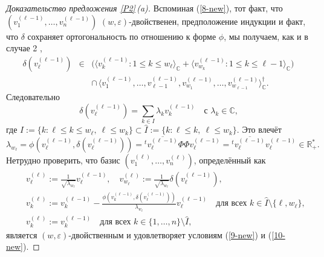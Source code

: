 \documentclass{amsart}
\theoremstyle{definition}
\begin{document}
\begin{proof}[Доказательство предложения \ref{P2}\,{\rm (a)}]
\medskip
{}

Вспоминая (\ref{8-new}), тот факт, что
$(v_1^{(\ell-1)},\ldots,v_n^{(\ell-1)})$
$(w,\varepsilon)$-двойственен, предположение индукции и  факт, что $\delta$ сохраняет ортогональность по отношению к форме $\phi$, мы получаем, как и в случае 2 ,
\begin{eqnarray*}
\delta(v_\ell^{(\ell-1)}) & \in & \big(\langle v_k^{(\ell-1)}:1\leq
k\leq w_\ell\rangle_\mathbb{C}+\langle v_{w_k}^{(\ell-1)}:1\leq k\leq
\ell-1\rangle_\mathbb{C}\big) \\
 & & \cap\,\langle
v_1^{(\ell-1)},\ldots,v_{\ell-1}^{(\ell-1)},v_{w_1}^{(\ell-1)},\ldots,v_{w_{\ell-1}}^{(\ell-1)}\rangle_\mathbb{C}^\dag.
\end{eqnarray*} Следовательно
\begin{equation} \label{11-new}
\delta(v_\ell^{(\ell-1)})=\sum_{k\in
I}\lambda_kv_k^{(\ell-1)}\quad\mbox{с $\lambda_k\in\mathbb{C}$,}
\end{equation}
где $I:=\{k:\ell\leq k\leq w_\ell,\ \ell\leq w_k\}\subset\hat{I}:=\{k:\ell\leq k,\ \ell\leq w_k\}$.
Это влечёт
\[\lambda_{w_\ell}=\phi(v_\ell^{(\ell-1)},\delta(v_\ell^{(\ell-1)}))={}^t\overline{v_\ell^{(\ell-1)}}\Phi\Phi v_\ell^{(\ell-1)}={}^t\overline{v_\ell^{(\ell-1)}}v_\ell^{(\ell-1)}\in\mathbb{R}_+^*.\]
Нетрудно проверить, что базис
$(v_1^{(\ell)},\ldots,v_n^{(\ell)})$, определённый как
\begin{eqnarray*}
 & & v_\ell^{(\ell)}:=\frac{1}{\sqrt{\lambda_{w_\ell}}}v_\ell^{(\ell-1)},\quad
v_{w_\ell}^{(\ell)}:=\frac{1}{\sqrt{\lambda_{w_\ell}}}\delta(v_\ell^{(\ell-1)}),
\\
 & & v_k^{(\ell)}:=v_k^{(\ell-1)}-\frac{\phi(v_k^{(\ell-1)},\delta(v_\ell^{(\ell-1)}))}{\lambda_{w_\ell}}v_\ell^{(\ell-1)}
\quad\mbox{для всех $k\in \hat{I}\setminus\{\ell,w_\ell\}$,} \\
 &  & v_k^{(\ell)}:=v_k^{(\ell-1)}\quad\mbox{для всех $k\in\{1,\ldots,n\}\setminus \hat{I}$,}
\end{eqnarray*}
 является $(w,\varepsilon)$-двойственным и удовлетворяет условиям
(\ref{9-new}) и (\ref{10-new}).
\end{proof}
\end{document}
